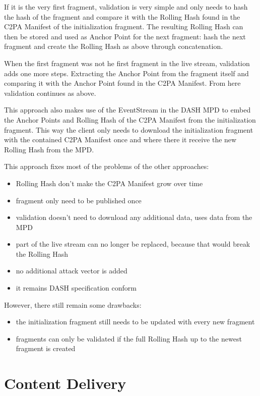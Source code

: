 If it is the very first fragment, validation is very simple and only needs to hash the hash of the fragment and compare it with the Rolling Hash found in the C2PA Manifest of the initialization fragment. The resulting Rolling Hash can then be stored and used as Anchor Point for the next fragment: hash the next fragment and create the Rolling Hash as above through concatenation.

When the first fragment was not he first fragment in the live stream, validation adds one more steps. Extracting the Anchor Point from the fragment itself and comparing it with the Anchor Point found in the C2PA Manifest. From here validation continues as above.

This approach also makes use of the EventStream in the DASH MPD  to embed the Anchor Points and Rolling Hash of the C2PA Manifest from the initialization fragment. This way the client only needs to download the initialization fragment with the contained C2PA Manifest once and where there it receive the new Rolling Hash from the MPD.

This approach fixes most of the problems of the other approaches:

\begin{itemize}
    \item Rolling Hash don't make the C2PA Manifest grow over time
    \item fragment only need to be published once
    \item validation doesn't need to download any additional data, uses data from the MPD
    \item part of the live stream can no longer be replaced, because that would break the Rolling Hash
    \item no additional attack vector is added
    \item it remains DASH specification conform 
\end{itemize}

However, there still remain some drawbacks:

\begin{itemize}
    \item the initialization fragment still needs to be updated with every new fragment
    \item fragments can only be validated if the full Rolling Hash up to the newest fragment is created
\end{itemize}

\section{Content Delivery\label{sec:cdn}}

